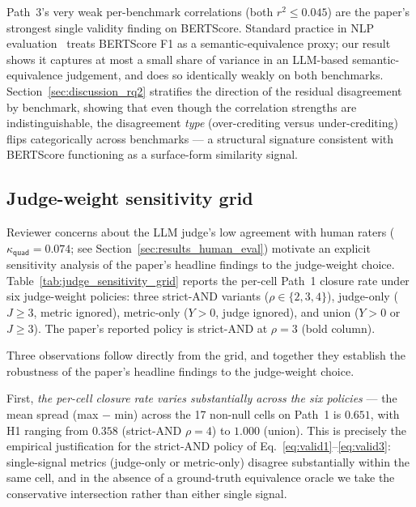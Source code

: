 Path~3's very weak per-benchmark correlations (both $r^2 \leq 0.045$) are the paper's strongest single validity finding on BERTScore. Standard practice in NLP evaluation~\citep{Zhang2020BERTScore} treats BERTScore F1 as a semantic-equivalence proxy; our result shows it captures at most a small share of variance in an LLM-based semantic-equivalence judgement, and does so identically weakly on both benchmarks. Section~\ref{sec:discussion_rq2} stratifies the direction of the residual disagreement by benchmark, showing that even though the correlation strengths are indistinguishable, the disagreement \emph{type} (over-crediting versus under-crediting) flips categorically across benchmarks --- a structural signature consistent with BERTScore functioning as a surface-form similarity signal.

\subsection{Judge-weight sensitivity grid}
\label{sec:results_judge_sensitivity}

Reviewer concerns about the LLM judge's low agreement with human raters ($\kappa_{\textsf{quad}} = 0.074$; see Section~\ref{sec:results_human_eval}) motivate an explicit sensitivity analysis of the paper's headline findings to the judge-weight choice. Table~\ref{tab:judge_sensitivity_grid} reports the per-cell Path~1 closure rate under six judge-weight policies: three strict-AND variants ($\rho \in \{2, 3, 4\}$), judge-only ($J \geq 3$, metric ignored), metric-only ($Y > 0$, judge ignored), and union ($Y > 0$ or $J \geq 3$). The paper's reported policy is strict-AND at $\rho = 3$ (bold column).



Three observations follow directly from the grid, and together they establish the robustness of the paper's headline findings to the judge-weight choice.

First, \emph{the per-cell closure rate varies substantially across the six policies} --- the mean spread (max $-$ min) across the 17 non-null cells on Path~1 is $0.651$, with H1 ranging from $0.358$ (strict-AND $\rho = 4$) to $1.000$ (union). This is precisely the empirical justification for the strict-AND policy of Eq.~\ref{eq:valid1}--\ref{eq:valid3}: single-signal metrics (judge-only or metric-only) disagree substantially within the same cell, and in the absence of a ground-truth equivalence oracle we take the conservative intersection rather than either single signal.

